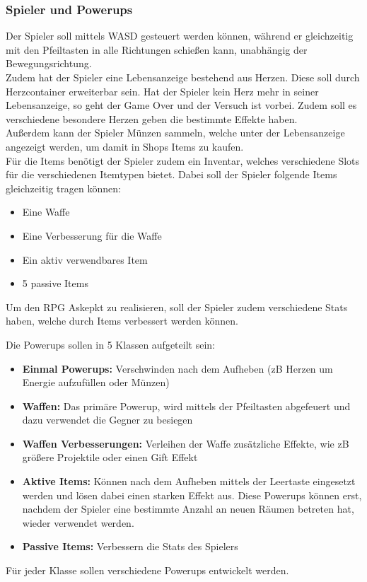 \subsubsection{Spieler und Powerups}
Der Spieler soll mittels WASD gesteuert werden können, während er gleichzeitig mit den Pfeiltasten in alle Richtungen schießen kann, unabhängig der Bewegungsrichtung. \\
Zudem hat der Spieler eine Lebensanzeige bestehend aus Herzen. Diese soll durch Herzcontainer erweiterbar sein. Hat der Spieler kein Herz mehr in seiner Lebensanzeige, so geht der Game Over und der Versuch ist vorbei.
Zudem soll es verschiedene besondere Herzen geben die bestimmte Effekte haben.\\
Außerdem kann der Spieler Münzen sammeln, welche unter der Lebensanzeige angezeigt werden, um damit in Shops Items zu kaufen.\\
Für die Items benötigt der Spieler zudem ein Inventar, welches verschiedene Slots für die verschiedenen Itemtypen bietet. Dabei soll der Spieler folgende Items gleichzeitig tragen können:
\begin{itemize}
\item Eine Waffe
\item Eine Verbesserung für die Waffe
\item Ein aktiv verwendbares Item
\item 5 passive Items
\end{itemize}
Um den RPG Askepkt zu realisieren, soll der Spieler zudem verschiedene Stats haben, welche durch Items verbessert werden können.
\bigskip

Die Powerups sollen in 5 Klassen aufgeteilt sein:
\begin{itemize}
\item \textbf{Einmal Powerups:} Verschwinden nach dem Aufheben (zB Herzen um Energie aufzufüllen oder Münzen)
\item \textbf{Waffen:} Das primäre Powerup, wird mittels der Pfeiltasten abgefeuert und dazu verwendet die Gegner zu besiegen
\item \textbf{Waffen Verbesserungen:} Verleihen der Waffe zusätzliche Effekte, wie zB größere Projektile oder einen Gift Effekt
\item \textbf{Aktive Items:} Können nach dem Aufheben mittels der Leertaste eingesetzt werden und lösen dabei einen starken Effekt aus. Diese Powerups können erst, nachdem der Spieler eine bestimmte Anzahl an neuen Räumen betreten hat, wieder verwendet werden.
\item \textbf{Passive Items:} Verbessern die Stats des Spielers
\end{itemize}
Für jeder Klasse sollen verschiedene Powerups entwickelt werden.


